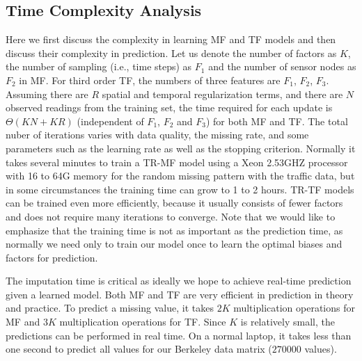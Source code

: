 \subsection{Time Complexity Analysis}
Here we first discuss the complexity in learning MF and TF models and then discuss their complexity in prediction.
Let us denote the number of factors as $K$, the number of sampling (i.e., time steps) as $F_1$ and the number of sensor nodes as $F_2$ in MF.
For third order TF, the numbers of three features are $F_1$, $F_2$, $F_3$.  
Assuming there are $R$ spatial and temporal regularization terms, and there are $N$ observed readings from the training set, the time required for each update is $\Theta(KN + KR)$ (independent of $F_1$, $F_2$ and $F_3$) for both MF and TF.
The total nuber of iterations varies with data quality, the missing rate, and some parameters such as the learning rate as well as the stopping criterion.
Normally it takes several minutes to train a TR-MF model using a Xeon 2.53GHZ processor with 16 to 64G memory for the random missing pattern with the traffic data, but in some circumstances the training time can grow to 1 to 2 hours.
TR-TF models can be trained even more efficiently, because it usually consists of fewer factors and does not require many iterations to converge. 
Note that we would like to emphasize that the training time is not as important as the prediction time, as normally we need only to train our model once to learn the optimal biases and factors for prediction.

The imputation time is critical as ideally we hope to achieve real-time prediction given a learned model. 
Both MF and TF are very efficient in prediction in theory and practice.
To predict a missing value, it takes $2K$ multiplication operations for MF and $3K$ multiplication operations for TF.
Since $K$ is relatively small, the predictions can be performed in real time.
On a normal laptop, it takes less than one second to predict all values for our Berkeley data matrix ($270000$ values).

